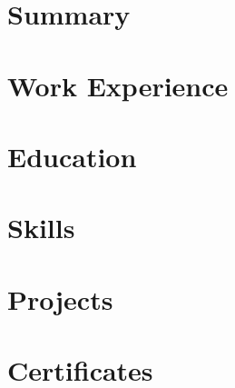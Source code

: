 \documentclass[11pt,a4paper]{moderncv}
\begin{document}
\makecvtitle

\section{Summary}
\cvline{}{[SUMMARY]}

\section{Work Experience}

\section{Education}

\section{Skills}

\section{Projects}

\section{Certificates}
\end{document}

